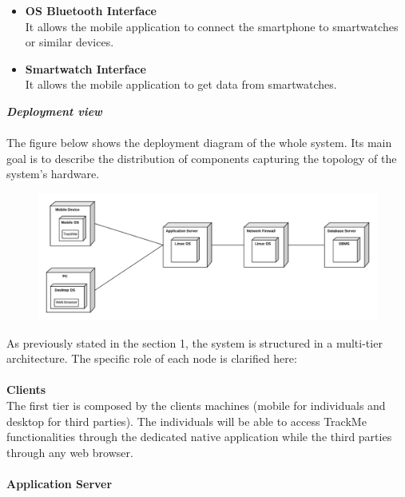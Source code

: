 \begin{legal}
\begin{itemize}
{\begin{itemize}
{			It allows the mobile application to make a SOS phone call in case of emergency.
						}\\
			\item{\textbf{OS Bluetooth Interface}\\
			It allows the mobile application to connect the smartphone to smartwatches or similar devices.
						}\\
			\item{\textbf{Smartwatch Interface}\\
			It allows the mobile application to get data from smartwatches.
						}\\
      	\end{itemize}
				}
		\end{itemize}

		\item \textit{\textbf{Deployment view}}\\\\
		The figure below shows the deployment diagram of the whole system. Its main goal is to describe the distribution of components capturing the topology of the
system's hardware.\\
		\begin{figure}[H]
		\includegraphics[width=\linewidth]{../images/design/DeploymentDiagram.png}\\
		\end{figure}
		As previously stated in the section 1, the system is structured in a multi-tier architecture. The specific role of each node is clarified here:\\\\
		\textbf{Clients}\\
The first tier is composed by the clients machines (mobile for individuals and desktop for third parties). The individuals will be able to access TrackMe functionalities through the dedicated native application while the third parties through any web browser.\\\\
		\textbf{Application Server}\\

\end{legal}
